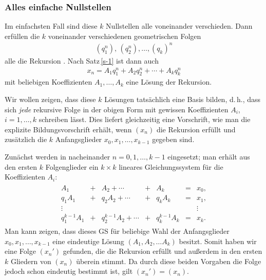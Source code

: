\documentclass[11pt,a4paper]{article}
\begin{document}
\subsubsection{Alles einfache Nullstellen}
Im einfachsten Fall sind diese $k$ Nullstellen alle voneinander verschieden.
Dann erfüllen die $k$ voneinander verschiedenen geometrischen Folgen
\begin{gather*}
(q_1^n),\, (q_2^n),\dots,(q_k)^n
\end{gather*}
alle die Rekursion \rf[e-linrek]. Nach Satz\,\ref{s-1}
ist dann auch
\begin{align}\label{e-allg}
x_n=A_1 q_1^n +A_2 q_2^n +\cdots  +A_k q_k^n
\end{align}
mit beliebigen Koeffizienten $A_1,\dots ,A_k$ eine Lösung der Rekursion.

Wir wollen zeigen, dass diese $k$ Lösungen tatsächlich eine Basis bilden,
d.\,h., dass sich \emph{jede} rekursive Folge \rf[e-linrek] in der obigen Form
\rf[e-allg] mit gewissen Koeffizienten $A_i$, $i=1,\dots , k$ schreiben lässt.
Dies liefert gleichzeitig eine Vorschrift, wie man die explizite
Bildungsvorschrift erhält, wenn $(x_n)$ die Rekursion erfüllt und zusätzlich
die $k$ Anfangsglieder $x_0,x_1,\dots , x_{k-1}$ gegeben sind.  

Zunächst werden in \rf[e-allg] nacheinander $n=0,1,\dots, k-1$ eingesetzt; man
erhält aus den ersten $k$ Folgenglieder ein $k\times k$ lineares
Gleichungssystem für die Koeffizienten $A_i$:
\begin{align*}
\begin{matrix}
A_1   &  +& A_2 +\cdots &  +  & A_k & = & x_0,\\
q_1A_1 & + & q_2 A_2 +\cdots &  +&  q_k A_k &= & x_1,\\
\vdots &&&&&& \vdots\\
q_1^{k-1} A_1&  + & q_2^{k-1} A_2 +\cdots & + & q_k^{k-1} A_k & = & x_k.
\end{matrix}
\end{align*}
Man kann zeigen, dass dieses GS für beliebige Wahl der Anfangsglieder
$x_0,x_1,\dots,x_{k-1}$ eine eindeutige Lösung $(A_1,A_2,\dots A_k)$ besitzt.
Somit haben wir eine Folge $(x_n')$ gefunden, die die Rekursion \rf[e-linrek]
erfüllt und außerdem in den ersten $k$ Gliedern von $(x_n)$ überein stimmt.  Da
durch diese beiden Vorgaben die Folge jedoch schon eindeutig bestimmt ist, gilt
$(x_n')=(x_n)$.
\end{document}
